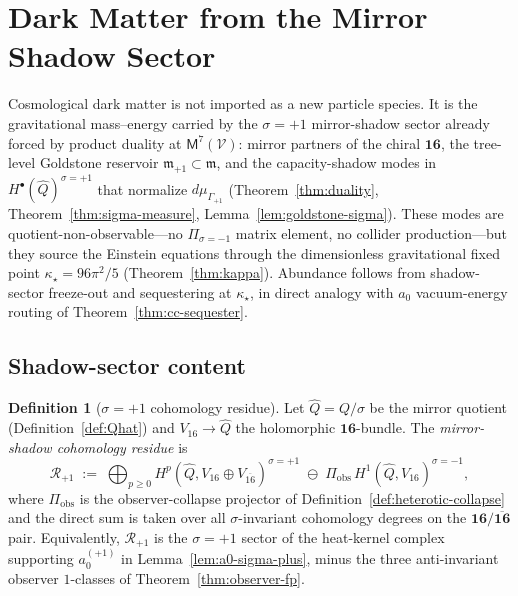 \documentclass[aps,prd,onecolumn,amsmath,amssymb,nofootinbib,11pt]{revtex4-2}
\numberwithin{equation}{section}
\theoremstyle{plain}
\theoremstyle{definition}
\newtheorem{definition}[theorem]{Definition}
\theoremstyle{remark}
\newcommand{\Void}{\mathcal{V}}
\newcommand{\Mirror}{\mathsf{M}}
\begin{document}
\section{Dark Matter from the Mirror Shadow Sector}
\label{sec:dark-sector}

Cosmological dark matter is not imported as a new particle species. It is the
gravitational mass--energy carried by the $\sigma=+1$ mirror-shadow sector
already forced by product duality at $\Mirror^7(\Void)$: mirror partners of the
chiral $\mathbf{16}$, the tree-level Goldstone reservoir
$\mathfrak{m}_{+1}\subset\mathfrak{m}$, and the capacity-shadow modes in
$H^\bullet(\hat Q)^{\sigma=+1}$ that normalize $d\mu_{\Gamma_{+1}}$
(Theorem~\ref{thm:duality}, Theorem~\ref{thm:sigma-measure},
Lemma~\ref{lem:goldstone-sigma}). These modes are quotient-non-observable---no
$\Pi_{\sigma=-1}$ matrix element, no collider production---but they source the
Einstein equations through the dimensionless gravitational fixed point
$\kappa_\star=96\pi^2/5$ (Theorem~\ref{thm:kappa}). Abundance follows from
shadow-sector freeze-out and sequestering at $\kappa_\star$, in direct analogy
with $a_0$ vacuum-energy routing of Theorem~\ref{thm:cc-sequester}.

\subsection{Shadow-sector content}
\label{sec:dark-sector:content}

\begin{definition}[$\sigma=+1$ cohomology residue]\label{def:dm-residue}
Let $\hat Q=Q/\sigma$ be the mirror quotient
(Definition~\ref{def:Qhat}) and $V_{16}\to\hat Q$ the holomorphic
$\mathbf{16}$-bundle. The \emph{mirror-shadow cohomology residue} is
\begin{equation}\label{eq:dm-residue}
  \mathcal{R}_{+1}
  \;:=\;
  \bigoplus_{p\geq 0}
  H^p(\hat Q, V_{16}\oplus V_{\overline{16}})^{\sigma=+1}
  \;\ominus\;
  \Pi_{\mathrm{obs}}\,H^1(\hat Q,V_{16})^{\sigma=-1},
\end{equation}
where $\Pi_{\mathrm{obs}}$ is the observer-collapse projector of
Definition~\ref{def:heterotic-collapse} and the direct sum is taken over all
$\sigma$-invariant cohomology degrees on the $\mathbf{16}/\overline{\mathbf{16}}$
pair. Equivalently, $\mathcal{R}_{+1}$ is the $\sigma=+1$ sector of the
heat-kernel complex supporting $a_0^{(+1)}$ in
Lemma~\ref{lem:a0-sigma-plus}, minus the three anti-invariant observer
$1$-classes of Theorem~\ref{thm:observer-fp}.
\end{definition}
\end{document}
